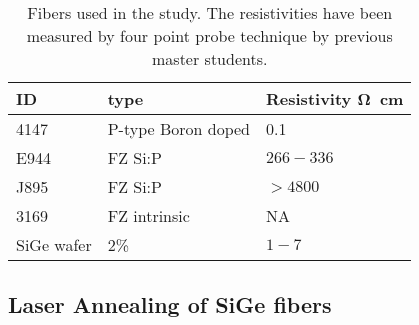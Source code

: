  \begin{table}[h]
\begin{center}
    \begin{tabular}{|l|l|l|  }
    \hline
    \textbf{ID} & \textbf{type} & \textbf{Resistivity \si{\ohm \cm}}   \\ \hline
    4147 & P-type Boron doped & 0.1 \\
    E944 & FZ Si:P &$266-336$\\
    J895 & FZ Si:P & $> 4800$    \\
    3169 & FZ intrinsic & NA\\
    SiGe wafer & 2\%&$1-7$\\
     \hline
    \end{tabular}
\end{center}
\caption{Fibers used in the study. The resistivities have been measured by four point probe technique by previous master students.\cite{} }
\label{Tab1}
\end{table}

\FloatBarrier
\subsection{Laser Annealing of SiGe fibers}


\FloatBarrier

\cleardoublepage



